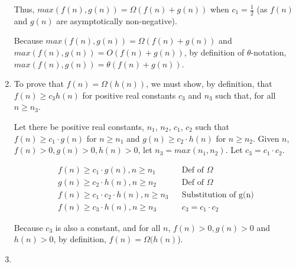 \documentclass[a4paper]{report}
\begin{document}
\begin{enumerate}
    Thus, $max(f(n), g(n)) = \Omega(f(n) + g(n))$ when $c_{1} = \frac{1}{2}$ (as $f(n)$ and $g(n)$ are asymptotically non-negative). 

    Because $max(f(n), g(n)) = \Omega(f(n) + g(n))$ and $max(f(n), g(n)) = O(f(n) + g(n))$, by definition of $\theta$-notation, $max(f(n), g(n)) = \theta(f(n) + g(n))$.

    \par
    \bigskip

    \item To prove that $f(n) = \Omega(h(n))$, we must show, by definition, that $f(n) \geq c_{3} h(n)$ for positive real constants $c_{3}$ and $n_{3}$ such that, for all $n \geq n_{3}$.

    Let there be positive real constants, $n_{1}$, $n_{2}$, $c_{1}$, $c_{2}$ such that $f(n) \geq c_{1} \cdot g(n)$ for $n \geq n_{1}$ and $g(n) \geq c_{2} \cdot h(n)$ for $n \geq n_{2}$.
    Given $n$, $f(n) > 0, g(n) > 0, h(n) > 0$, let $n_{3} = max(n_{1}, n_{2})$. Let $c_{3} = c_{1} \cdot c_{2}$.

    \begin{align}
      f(n) \geq c_{1} \cdot g(n), n \geq n_{1}             &&\text{Def of $\Omega$}\\
      g(n) \geq c_{2} \cdot h(n), n \geq n_{2}             &&\text{Def of $\Omega$}\\
      f(n) \geq c_{1} \cdot c_{2} \cdot h(n), n \geq n_{3} &&\text{Substitution of g(n)}\\
      f(n) \geq c_{3} \cdot h(n), n \geq n_{3}             &&\text{$c_{3} = c_{1} \cdot c_{2}$}
    \end{align}

    Because $c_{3}$ is also a constant, and for all $n$, $f(n) > 0, g(n) > 0$ and $h(n) > 0$, by definition,
    $f(n) = \Omega(h(n)$).

    \par
    \bigskip

    \item 

  \end{enumerate}

  
  
\end{document}
